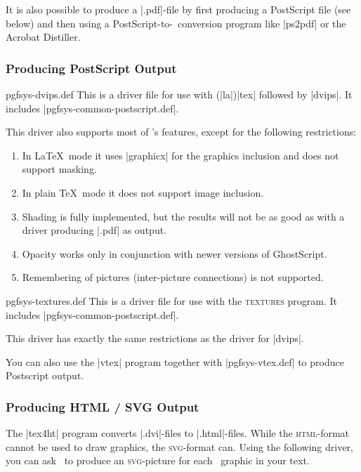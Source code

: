 It is also possible to produce a |.pdf|-file by first producing a
PostScript file (see below) and then using a PostScript-to-\pdf\
conversion program like |ps2pdf| or the Acrobat Distiller.


\subsubsection{Producing PostScript Output}

\begin{filedescription}{pgfsys-dvips.def}
  This is a driver file for use with (|la|)|tex| followed by
  |dvips|. It includes |pgfsys-common-postscript.def|.

  This driver also supports most of \pgfname's features, except for
  the following restrictions:
  \begin{enumerate}
  \item
    In \LaTeX\ mode it uses |graphicx| for the graphics
    inclusion and does not support masking.
  \item
    In plain \TeX\ mode it does not support image inclusion.
  \item
    Shading is fully implemented, but the results will not be 
    as good as with a driver producing |.pdf| as output. 
  \item
    Opacity works only in conjunction with newer versions of
    GhostScript. 
  \item
    Remembering of pictures (inter-picture connections) is not
    supported. 
  \end{enumerate}
\end{filedescription}

\begin{filedescription}{pgfsys-textures.def}
  This is a driver file for use with the \textsc{textures} program. It
  includes |pgfsys-common-postscript.def|. 

  This driver has exactly the same restrictions as the driver for
  |dvips|. 
\end{filedescription}

You can also use the |vtex| program together with |pgfsys-vtex.def| to
produce Postscript output.



\subsubsection{Producing HTML / SVG Output}

The |tex4ht| program converts |.dvi|-files to |.html|-files. While the
\textsc{html}-format cannot be used to draw graphics, the
\textsc{svg}-format can. Using the following driver, you can ask
\pgfname\ to produce an \textsc{svg}-picture for each \pgfname\
graphic in your text.

